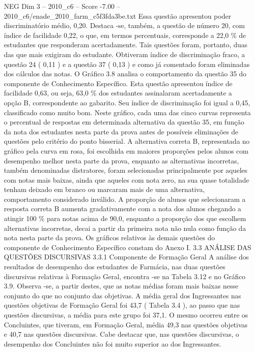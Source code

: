 \begin{textsample}{NEG Dim 3 – 2010\_c6 – Score -7.00 – 2010\_c6/enade\_2010\_farm\_c5f3fda3be.txt}
Essa questão apresentou poder discriminatório médio, 0,20.
Destaca -se, também, a questão de número 20, com índice de facilidade 0,22, o que, em termos percentuais, corresponde a 22,0 \% de estudantes que responderam acertadamente.
Tais questões foram, portanto, duas das que mais exigiram do estudante.
Obtiveram índice de discriminação fraco, a questão 24 ( 0,11 ) e a questão 37 ( 0,13 ) e como já comentado foram eliminadas dos cálculos das notas.
O Gráfico 3.8 analisa o comportamento da questão 35 do componente de Conhecimento Específico.
Esta questão apresentou índice de facilidade 0,63, ou seja, 63,0 \% dos estudantes assinalaram acertadamente a opção B, correspondente ao gabarito.
Seu índice de discriminação foi igual a 0,45, classificado como muito bom.
Neste gráfico, cada uma das cinco curvas representa o percentual de respostas em determinada alternativa da questão 35, em função da nota dos estudantes nesta parte da prova antes de possíveis eliminações de questões pelo critério do ponto bisserial.
A alternativa correta B, representada no gráfico pela curva em rosa, foi escolhida em maiores proporções pelos alunos com desempenho melhor nesta parte da prova, enquanto as alternativas incorretas, também denominadas distratores, foram selecionadas principalmente por aqueles com notas mais baixas, ainda que aqueles com nota zero, na sua quase totalidade tenham deixado em branco ou marcaram mais de uma alternativa, comportamento considerado inválido.
A proporção de alunos que selecionaram a resposta correta B aumenta gradativamente com a nota dos alunos chegando a atingir 100 \% para notas acima de 90,0, enquanto a proporção dos que escolhem alternativas incorretas, decai a partir da primeira nota não nula como função da nota nesta parte da prova.
Os gráficos relativos às demais questões do componente de Conhecimento Específico constam do Anexo I. 3.3 ANÁLISE DAS QUESTÕES DISCURSIVAS 3.3.1 Componente de Formação Geral A análise dos resultados de desempenho dos estudantes de Farmácia, nas duas questões discursivas relativas à Formação Geral, encontra -se na Tabela 3.12 e no Gráfico 3.9.
Observa -se, a partir destes, que as notas médias foram mais baixas nesse conjunto do que no conjunto das objetivas.
A média geral dos Ingressantes nas questões objetivas de Formação Geral foi 43,7 ( Tabela 3.4 ), ao passo que nas questões discursivas, a média para este grupo foi 37,1.
O mesmo ocorreu entre os Concluintes, que tiveram, em Formação Geral, média 49,3 nas questões objetivas e 40,7 nas questões discursivas.
Cabe destacar que, nas questões discursivas, o desempenho dos Concluintes não foi muito superior ao dos Ingressantes.

\end{textsample}
